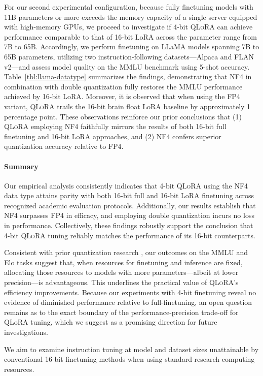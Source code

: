 For our second experimental configuration, because fully finetuning models with 11B parameters or more exceeds the memory capacity of a single server equipped with high-memory GPUs, we proceed to investigate if 4-bit \textsc{QLoRA} can achieve performance comparable to that of 16-bit LoRA across the parameter range from 7B to 65B. Accordingly, we perform finetuning on LLaMA models spanning 7B to 65B parameters, utilizing two instruction-following datasets—Alpaca and FLAN v2—and assess model quality on the MMLU benchmark using 5-shot accuracy. Table~\ref{tbl:llama-datatype} summarizes the findings, demonstrating that NF4 in combination with double quantization fully restores the MMLU performance achieved by 16-bit LoRA. Moreover, it is observed that when using the FP4 variant, \textsc{QLoRA} trails the 16-bit brain float LoRA baseline by approximately 1 percentage point. These observations reinforce our prior conclusions that (1) \textsc{QLoRA} employing NF4 faithfully mirrors the results of both 16-bit full finetuning and 16-bit LoRA approaches, and (2) NF4 confers superior quantization accuracy relative to FP4.

\paragraph{Summary} Our empirical analysis consistently indicates that 4-bit \textsc{QLoRA} using the NF4 data type attains parity with both 16-bit full and 16-bit LoRA finetuning across recognized academic evaluation protocols. Additionally, our results establish that NF4 surpasses FP4 in efficacy, and employing double quantization incurs no loss in performance. Collectively, these findings robustly support the conclusion that 4-bit \textsc{QLoRA} tuning reliably matches the performance of its 16-bit counterparts.

Consistent with prior quantization research \citep{dettmers2022case}, our outcomes on the MMLU and Elo tasks suggest that, when resources for finetuning and inference are fixed, allocating those resources to models with more parameters—albeit at lower precision—is advantageous. This underlines the practical value of \textsc{QLoRA}'s efficiency improvements. Because our experiments with 4-bit finetuning reveal no evidence of diminished performance relative to full-finetuning, an open question remains as to the exact boundary of the performance-precision trade-off for QLoRA tuning, which we suggest as a promising direction for future investigations.

We aim to examine instruction tuning at model and dataset sizes unattainable by conventional 16-bit finetuning methods when using standard research computing resources.

